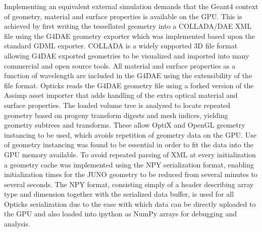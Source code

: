 \documentclass[a4paper]{jpconf}
\begin{document}
Implementing an equivalent external simulation demands that the Geant4 
context of geometry, material and surface properties is available on the GPU.
This is achieved by first writing the tessellated geometry into a COLLADA/DAE XML file  
using the G4DAE\cite{g4daeURL} geometry exporter which was implemented based upon the 
standard GDML exporter. COLLADA is a widely supported 3D file format allowing G4DAE exported geometries 
to be visualized and imported into many commercial and open source tools.
All material and surface properties as a function of wavelength are 
included in the G4DAE using the extensibility of the file format.
Opticks reads the G4DAE geometry file using a forked version\cite{AssimpFork} of the
Assimp\cite{Assimp} asset importer that adds handling of the extra optical material and surface
properties. 
The loaded volume tree is analysed to locate repeated geometry based 
on progeny transform digests and mesh indices, yielding geometry subtrees and transforms.
These allow OptiX and OpenGL geometry instancing to be used, which avoids repetition of geometry 
data on the GPU. Use of geometry instancing was found to be essential in order to fit the 
data into the GPU memory available. 
To avoid repeated parsing of XML at every initialization
a geometry cache was implemented using the NPY\cite{NPY} serialization format, enabling 
initialization times for the JUNO geometry to be reduced from several minutes to several seconds.
The NPY format, consisting simply of a header describing array type and dimension together 
with the serialized data buffer, is used for all Opticks serialization due
to the ease with which data can be directly uploaded to the GPU and also 
loaded into ipython\cite{ipython} as NumPy\cite{numpy} arrays for debugging and analysis.
\end{document}
